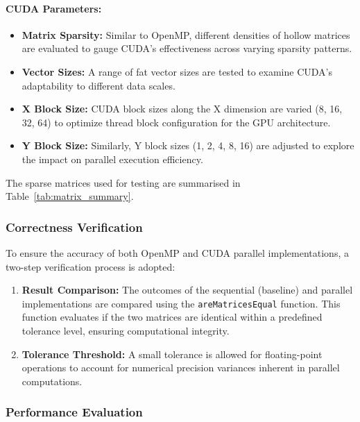 \documentclass[12pt,oneside]{book} %
\begin{document}
\paragraph{CUDA Parameters:}
\begin{itemize}
    \item \textbf{Matrix Sparsity:} Similar to OpenMP, different densities of hollow matrices are evaluated to gauge CUDA’s effectiveness across varying sparsity patterns.
    \item \textbf{Vector Sizes:} A range of fat vector sizes are tested to examine CUDA's adaptability to different data scales.
    \item \textbf{X Block Size:} CUDA block sizes along the X dimension are varied (8, 16, 32, 64) to optimize thread block configuration for the GPU architecture.
    \item \textbf{Y Block Size:} Similarly, Y block sizes (1, 2, 4, 8, 16) are adjusted to explore the impact on parallel execution efficiency.
\end{itemize}

The sparse matrices used for testing are summarised in
Table~\ref{tab:matrix_summary}.

\subsubsection{Correctness Verification}

To ensure the accuracy of both OpenMP and CUDA parallel implementations, a
two-step verification process is adopted:
\begin{enumerate}
    \item \textbf{Result Comparison:} The outcomes of the sequential (baseline) and parallel implementations are compared using the \texttt{areMatricesEqual} function. This function evaluates if the two matrices are identical within a predefined tolerance level, ensuring computational integrity.
    \item \textbf{Tolerance Threshold:} A small tolerance is allowed for floating-point operations to account for numerical precision variances inherent in parallel computations.
\end{enumerate}

\subsubsection{Performance Evaluation}
\end{document}
